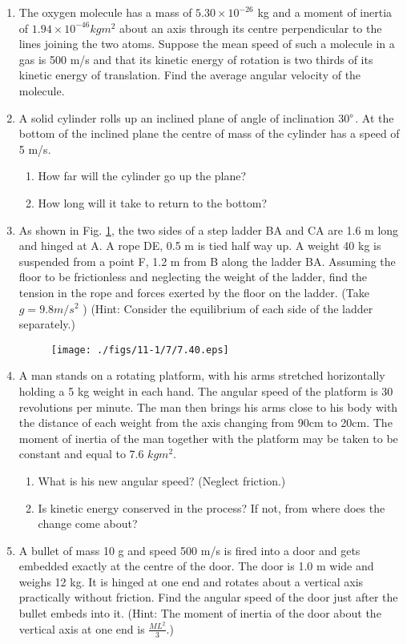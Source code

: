 \begin{enumerate}[label=\thesection.\arabic*.,ref=\thesection.\theenumi]
\item  The oxygen molecule has a mass of $5.30  \times  10^{-26} $ kg and a moment of inertia of
$1.94 \times 10^{-46} kg m^2$ about an axis through its centre perpendicular to the lines joining
the two atoms. Suppose the mean speed of such a molecule in a gas is 500 m/s and that its kinetic energy of rotation is two thirds of its kinetic energy of translation. Find the average angular velocity of the molecule.
\item  A solid cylinder rolls up an inclined plane of angle of inclination 30$\degree$. At the bottom of the inclined plane the centre of mass of the cylinder has a speed of 5 m/s. 
\begin{enumerate}[label=(\alph*)]
\item How far will the cylinder go up the plane? 
\item  How long will it take to return to the bottom?
\end{enumerate}
\item  As shown in Fig. \ref{fig:7.40}, the two sides of a step ladder BA and CA are 1.6 m long and hinged at A. A rope DE, 0.5 m is tied half way up. A weight 40 kg is suspended from a point F, 1.2 m from B along the ladder BA. Assuming the floor to be frictionless and neglecting the weight of the ladder, find the tension in the rope and forces exerted by the floor on the ladder. (Take $g = 9.8 m/s^2$
) (Hint: Consider the equilibrium of each side of the ladder separately.) 
\begin{figure}[!ht]
\texttt{[image: ./figs/11-1/7/7.40.eps]}
\caption{}
\label{fig:7.40}
\end{figure}
%
\item A man stands on a rotating platform, with his arms stretched horizontally holding a 5 kg weight in each hand. The angular speed of the platform is 30 revolutions per minute. The man then brings his arms close to his body with the distance of each weight from the axis changing from 90cm to 20cm. The moment of inertia of the man together with the platform may be taken to be constant and equal to 7.6 $kg m^2$.
\begin{enumerate}[label=(\alph*)]
\item  What is his new angular speed? (Neglect friction.) 
\item  Is kinetic energy conserved in the process? If not, from where does the change come about?
\end{enumerate}
\item A bullet of mass 10 g and speed 500 m/s is fired into a door and gets embedded exactly at the centre of the door. The door is 1.0 m wide and weighs 12 kg. It is hinged at one end and rotates about a vertical axis practically without friction. Find the angular speed of the door just after the bullet embeds into it. (Hint: The moment of inertia of the door about the vertical axis at one end is $\frac{ML^2}{3}$.)

\end{enumerate}

